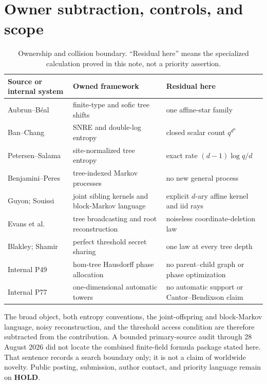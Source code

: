 \documentclass[11pt,a4paper]{amsart}
\theoremstyle{definition}
\theoremstyle{remark}
\begin{document}
\section{Owner subtraction, controls, and scope}
\label{sec:scope}

\begin{table}[H]
\centering
\caption{Ownership and collision boundary.  ``Residual here'' means the
specialized calculation proved in this note, not a priority assertion.}
\label{tab:owners}
\begin{tabular}{@{}>{\raggedright\arraybackslash}p{}
                    >{\raggedright\arraybackslash}p{}
                    >{\raggedright\arraybackslash}p{}@{}}
\toprule
Source or internal system & Owned framework & Residual here \\
\midrule
Aubrun--B\'eal & finite-type and sofic tree shifts & one affine-star family \\
Ban--Chang & SNRE and double-log entropy & closed scalar count $q^{d^h}$ \\
Petersen--Salama & site-normalized tree entropy & exact rate $(d-1)\log q/d$ \\
Benjamini--Peres & tree-indexed Markov processes & no new general process \\
Guyon; Souissi & joint sibling kernels and block-Markov language & explicit $d$-ary affine kernel and iid rays \\
Evans et al. & tree broadcasting and root reconstruction & noiseless coordinate-deletion law \\
Blakley; Shamir & perfect threshold secret sharing & one law at every tree depth \\
Internal P49 & hom-tree Hausdorff phase allocation & no parent--child graph or phase optimization \\
Internal P77 & one-dimensional automatic towers & no automatic support or Cantor--Bendixson claim \\
\bottomrule
\end{tabular}
\end{table}

The broad object, both entropy conventions, the joint-offspring and
block-Markov language, noisy reconstruction, and the threshold access
condition are therefore subtracted from the contribution.  A bounded
primary-source audit through 28 August 2026 did not locate the combined
finite-field formula package stated here.  That sentence records a search
boundary only; it is not a claim of worldwide novelty.  Public posting,
submission, author contact, and priority language remain on \textbf{HOLD}.
\end{document}
